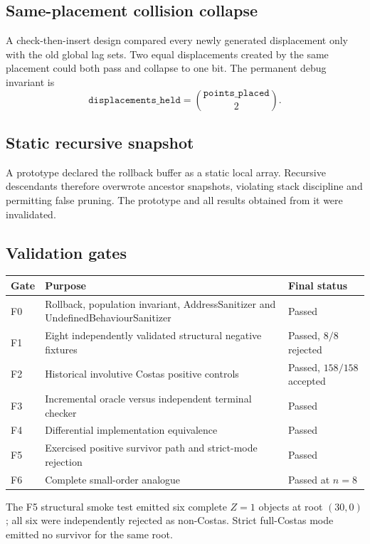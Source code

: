 \documentclass[11pt,a4paper]{article}
\theoremstyle{definition}\newtheorem{definition}[theorem]{Definition}
\theoremstyle{remark}\newtheorem{remark}[theorem]{Remark}
\begin{document}
\subsection{Same-placement collision collapse}
A check-then-insert design compared every newly generated displacement only with the old global lag sets. Two equal displacements created by the same placement could both pass and collapse to one bit. The permanent debug invariant is
\[
\boxed{\texttt{displacements\_held}=\binom{\texttt{points\_placed}}2.}
\]

\subsection{Static recursive snapshot}
A prototype declared the rollback buffer as a static local array. Recursive descendants therefore overwrote ancestor snapshots, violating stack discipline and permitting false pruning. The prototype and all results obtained from it were invalidated.

\subsection{Validation gates}
\begin{longtable}{@{}p{}p{}p{}@{}}
\toprule Gate & Purpose & Final status\\\midrule
F0 & Rollback, population invariant, AddressSanitizer and UndefinedBehaviourSanitizer & Passed\\
F1 & Eight independently validated structural negative fixtures & Passed, $8/8$ rejected\\
F2 & Historical involutive Costas positive controls & Passed, $158/158$ accepted\\
F3 & Incremental oracle versus independent terminal checker & Passed\\
F4 & Differential implementation equivalence & Passed\\
F5 & Exercised positive survivor path and strict-mode rejection & Passed\\
F6 & Complete small-order analogue & Passed at $n=8$\\\bottomrule
\end{longtable}
The F5 structural smoke test emitted six complete $Z=1$ objects at root $(30,0)$; all six were independently rejected as non-Costas. Strict full-Costas mode emitted no survivor for the same root.
\end{document}
